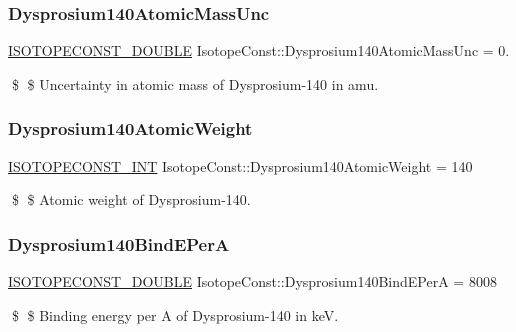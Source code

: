 \subsubsection{\texorpdfstring{Dysprosium140\+Atomic\+Mass\+Unc}{Dysprosium140AtomicMassUnc}}
{\footnotesize\ttfamily \mbox{\hyperlink{group___isotope_const-_macros_ga8f45a7272ce02c0b4c65c44636ed719a}{I\+S\+O\+T\+O\+P\+E\+C\+O\+N\+S\+T\+\_\+\+D\+O\+U\+B\+LE}} Isotope\+Const\+::\+Dysprosium140\+Atomic\+Mass\+Unc = 0.}

\$ \$ Uncertainty in atomic mass of Dysprosium-\/140 in amu. \mbox{\label{group___isotope_const-_dysprosium-_dy140_gab449594aa884a538a62602fe1f650a30}} 
\subsubsection{\texorpdfstring{Dysprosium140\+Atomic\+Weight}{Dysprosium140AtomicWeight}}
{\footnotesize\ttfamily \mbox{\hyperlink{group___isotope_const-_macros_ga5f18360b3e99483a35c32d789e62621c}{I\+S\+O\+T\+O\+P\+E\+C\+O\+N\+S\+T\+\_\+\+I\+NT}} Isotope\+Const\+::\+Dysprosium140\+Atomic\+Weight = 140}

\$ \$ Atomic weight of Dysprosium-\/140. \mbox{\label{group___isotope_const-_dysprosium-_dy140_gacca1438714392be0ce3b4a20dca22a8d}} 
\subsubsection{\texorpdfstring{Dysprosium140\+Bind\+E\+PerA}{Dysprosium140BindEPerA}}
{\footnotesize\ttfamily \mbox{\hyperlink{group___isotope_const-_macros_ga8f45a7272ce02c0b4c65c44636ed719a}{I\+S\+O\+T\+O\+P\+E\+C\+O\+N\+S\+T\+\_\+\+D\+O\+U\+B\+LE}} Isotope\+Const\+::\+Dysprosium140\+Bind\+E\+PerA = 8008}

\$ \$ Binding energy per A of Dysprosium-\/140 in keV. \mbox{\label{group___isotope_const-_dysprosium-_dy140_gae89aa0211032d0bbdf8a2d2ca20dfd79}} 
